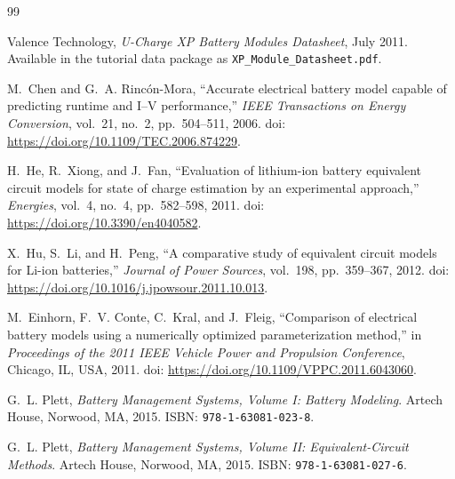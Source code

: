 \documentclass[a4paper,12pt]{article}
\begin{document}
\begin{thebibliography}{99}


Valence Technology,
\textit{U-Charge XP Battery Modules Datasheet},
July 2011.
Available in the tutorial data package as \texttt{XP\_Module\_Datasheet.pdf}.


M.~Chen and G.~A. Rinc\'on-Mora,
``Accurate electrical battery model capable of predicting runtime and I--V performance,''
\textit{IEEE Transactions on Energy Conversion},
vol.~21,
no.~2,
pp.~504--511,
2006.
doi:
\url{https://doi.org/10.1109/TEC.2006.874229}.

H.~He, R.~Xiong, and J.~Fan,
``Evaluation of lithium-ion battery equivalent circuit models for state of charge estimation by an experimental approach,''
\textit{Energies},
vol.~4,
no.~4,
pp.~582--598,
2011.
doi:
\url{https://doi.org/10.3390/en4040582}.

X.~Hu, S.~Li, and H.~Peng,
``A comparative study of equivalent circuit models for Li-ion batteries,''
\textit{Journal of Power Sources},
vol.~198,
pp.~359--367,
2012.
doi:
\url{https://doi.org/10.1016/j.jpowsour.2011.10.013}.

M.~Einhorn, F.~V. Conte, C.~Kral, and J.~Fleig,
``Comparison of electrical battery models using a numerically optimized parameterization method,''
in \textit{Proceedings of the 2011 IEEE Vehicle Power and Propulsion Conference},
Chicago, IL, USA,
2011.
doi:
\url{https://doi.org/10.1109/VPPC.2011.6043060}.

G.~L. Plett,
\textit{Battery Management Systems, Volume I: Battery Modeling}.
Artech House,
Norwood, MA,
2015.
ISBN:
\texttt{978-1-63081-023-8}.

G.~L. Plett,
\textit{Battery Management Systems, Volume II: Equivalent-Circuit Methods}.
Artech House,
Norwood, MA,
2015.
ISBN:
\texttt{978-1-63081-027-6}.



\end{thebibliography}
\end{document}
